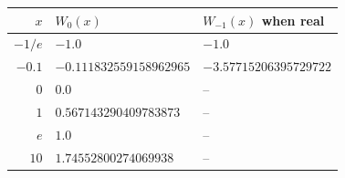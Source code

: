 \begin{tabular}{@{}rll@{}}
\toprule
$x$ & $W_0(x)$ & $W_{-1}(x)$ when real \\
\midrule
$-1/e$ & $-1.0$ & $-1.0$ \\
$-0.1$ & $-0.111832559158962965$ & $-3.57715206395729722$ \\
$0$ & $0.0$ & -- \\
$1$ & $0.567143290409783873$ & -- \\
$e$ & $1.0$ & -- \\
$10$ & $1.74552800274069938$ & -- \\
\bottomrule
\end{tabular}
